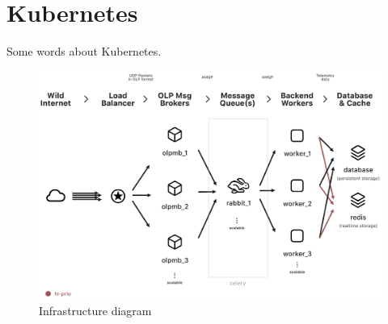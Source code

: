 \section{Kubernetes}\label{sec:kubernetes}
Some words about Kubernetes. %










\begin{figure}
    \centering
    \includegraphics[scale=0.29, angle=90]{assets/infrastructure-diagram.png}
    \caption{Infrastructure diagram\cite{dataInfrastructure}}
    \label{fig:infrastracture-diagram}
\end{figure}
